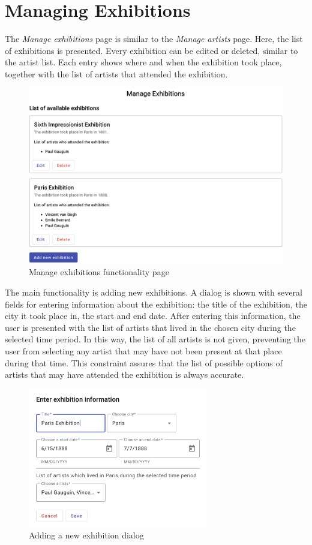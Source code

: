 \section{Managing Exhibitions}\label{sec:managing-exhibitions}
The \emph{Manage exhibitions} page is similar to the \emph{Manage artists} page. Here, the list of exhibitions is presented. Every exhibition can
be edited or deleted, similar to the artist list. Each entry shows where and when the exhibition took place, together with the list of artists
that attended the exhibition.

\begin{figure}[hbt!]
    \begin{center}
        \includegraphics[width=\textwidth]{graphics/3-implementation/5}
    \end{center}
    \caption{Manage exhibitions functionality page}
    \label{fig:figure3.5}
\end{figure}

The main functionality is adding new exhibitions. A dialog is shown with several fields for entering information about the exhibition: the title of
the exhibition, the city it took place in, the start and end date. After entering this information, the user is presented with the list of artists
that lived in the chosen city during the selected time period. In this way, the list of all artists is not given, preventing the user from
selecting any artist that may have not been present at that place during that time. This constraint assures that the list of possible options of
artists that may have attended the exhibition is always accurate.

\clearpage

\begin{figure}[ht!]
    \begin{center}
        \includegraphics[width=0.7\textwidth]{graphics/3-implementation/6}
    \end{center}
    \caption{Adding a new exhibition dialog}
    \label{fig:figure3.6}
\end{figure}